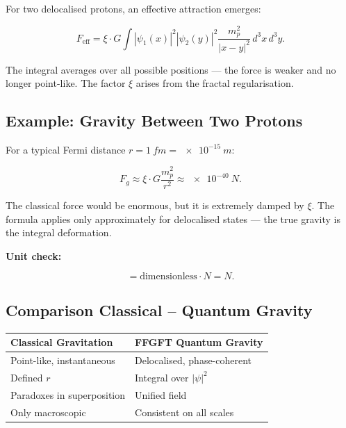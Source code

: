 	For two delocalised protons, an effective attraction emerges:
	
	\begin{equation}
		F_{\text{eff}} = \xi \cdot G \int |\psi_1(x)|^2 |\psi_2(y)|^2 \frac{m_p^2}{|x-y|^2} \, d^3x \, d^3y.
	\end{equation}
	
	The integral averages over all possible positions — the force is weaker and no longer point-like. The factor \(\xi\) arises from the fractal regularisation.
	
	\subsection*{Example: Gravity Between Two Protons}
	
	For a typical Fermi distance \(r = \SI{1}{fm} = \SI{e-15}{m}\):
	
	\begin{equation}
		F_g \approx \xi \cdot G \frac{m_p^2}{r^2} \approx \SI{e-40}{N}.
	\end{equation}
	
	The classical force would be enormous, but it is extremely damped by \(\xi\). The formula applies only approximately for delocalised states — the true gravity is the integral deformation.
	
	\textbf{Unit check:}
	
	\begin{equation}
		[F_g] = \text{dimensionless} \cdot \si{N} = \si{N}.
	\end{equation}
	
	\subsection*{Comparison Classical – Quantum Gravity}
	
	\begin{center}
		\begin{tabular}{p{}p{}}
			\textbf{Classical Gravitation} & \textbf{FFGFT Quantum Gravity} \\
			\hline
			Point-like, instantaneous & Delocalised, phase-coherent \\
			Defined $r$ & Integral over $|\psi|^2$ \\
			Paradoxes in superposition & Unified field \\
			Only macroscopic & Consistent on all scales \\
		\end{tabular}
	\end{center}
	
